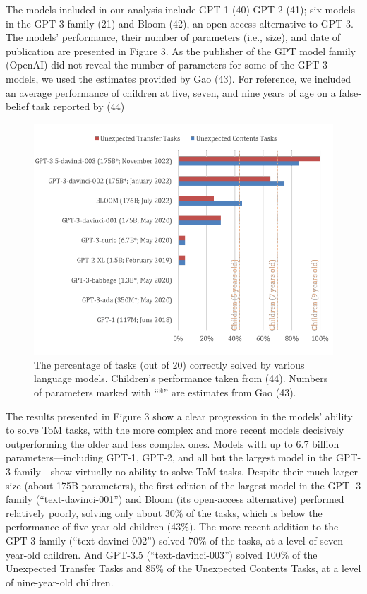 \documentclass[11pt]{article}
\begin{document}
The models included in our analysis include GPT-1 (40) GPT-2 (41); six models in the GPT-3 family (21) and Bloom (42), an open-access alternative to GPT-3. The models’ performance, their number of parameters (i.e., size), and date of publication are presented in Figure 3. As the publisher of the GPT model family (OpenAI) did not reveal the number of parameters for some 
of the GPT-3 models, we used the estimates provided by Gao (43). For reference, we included an average performance of children at five, seven, and nine years of age on a false-belief task reported by (44)

\begin{figure}
\includegraphics[width=\textwidth]{004.png}
\caption{The percentage of tasks (out of 20) correctly solved by various language models. Children’s performance taken from (44). Numbers of parameters marked with “*” are estimates from Gao (43).}    
\end{figure}

The results presented in Figure 3 show a clear progression in the models’ ability to solve ToM tasks, with the more complex and more recent models decisively outperforming the older and less complex ones. Models with up to 6.7 billion parameters—including GPT-1, GPT-2, and all but the largest model in the GPT-3 family—show virtually no ability to solve ToM tasks. Despite their much larger size (about 175B parameters), the first edition of the largest model in the GPT- 3 family (“text-davinci-001”) and Bloom (its open-access alternative) performed relatively poorly, solving only about 30\% of the tasks, which is below the performance of five-year-old children (43\%). The more recent addition to the GPT-3 family (“text-davinci-002”) solved 70\% of the tasks, at a level of seven-year-old children. And GPT-3.5 (“text-davinci-003”) solved 100\% of the Unexpected Transfer Tasks and 85\% of the Unexpected Contents Tasks, at a level of nine-year-old children.
\end{document}
